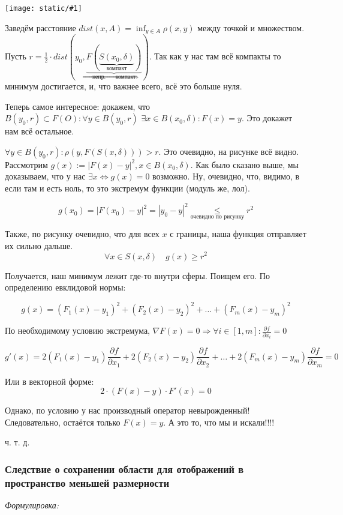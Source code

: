 \documentclass{article}
\def\dbl{\,\,}
\def\image#1{\texttt{[image: static/\#1]}}
\begin{document}
\image{sohr_obl_2.png}

Заведём расстояние $dist(x, A) = \inf_{y \in A} \rho(x, y)$ между точкой и множеством. Пусть $r = \frac{1}{2} \cdot dist(y_0, \underbrace{F(\underbrace{S(x_0, \delta)}_{\text{компакт}})}_{\text{непр. } \Rightarrow \text{ компакт}})$. Так как у нас там всё компакты то минимум достигается, и, что важнее всего, всё это больше нуля.

Теперь самое интересное: докажем, что $B(y_0, r) \subset F(O): \forall y \in B(y_0, r) \dbl \exists x \in B(x_0, \delta): F(x) = y$. Это докажет нам всё остальное.

$\forall y \in B(y_0, r): \rho(y, F(S(x, \delta))) > r$. Это очевидно, на рисунке всё видно. Рассмотрим $g(x) := |F(x) - y|^2, x \in B(x_0, \delta)$. Как было сказано выше, мы доказываем, что у нас $\exists x \Leftrightarrow g(x) = 0$ возможно. Ну, очевидно, что, видимо, в если там и есть ноль, то это экстремум функции (модуль же, лол).

\[g(x_0) = |F(x_0) - y|^2 = |y_0 - y|^2 \underset{\text{очевидно по рисунку}}{\le} r^2\]

Также, по рисунку очевидно, что для всех $x$ с границы, наша функция отправляет их сильно дальше.
\[\forall x \in S(x, \delta) \quad g(x) \ge r^2\]

Получается, наш минимум лежит где-то внутри сферы. Поищем его. По определению евклидовой нормы:

\[g(x) = (F_1(x) - y_1)^2 + (F_2(x) - y_2)^2 + \ldots + (F_m(x) - y_m)^2\]

По необходимому условию экстремума, $\nabla F(x) = 0 \Rightarrow \forall i \in [1, m]: \frac{\partial f}{\partial x_i} = 0$

\[g'(x) = 2(F_1(x) - y_1)\frac{\partial f}{\partial x_1} + 2(F_2(x) - y_2)\frac{\partial f}{\partial x_2} + \ldots + 2(F_m(x) - y_m)\frac{\partial f}{\partial x_m} = 0\]

Или в векторной форме:
\[2 \cdot (F(x) - y) \cdot F'(x) = 0\]

Однако, по условию у нас производный оператор невырожденный! Следовательно, остаётся только $F(x) = y$. А это то, что мы и искали!!!!

ч. т. д.


\subsubsection{Следствие о сохранении области для отображений в пространство меньшей размерности}
\textit{Формулировка:}
\end{document}
